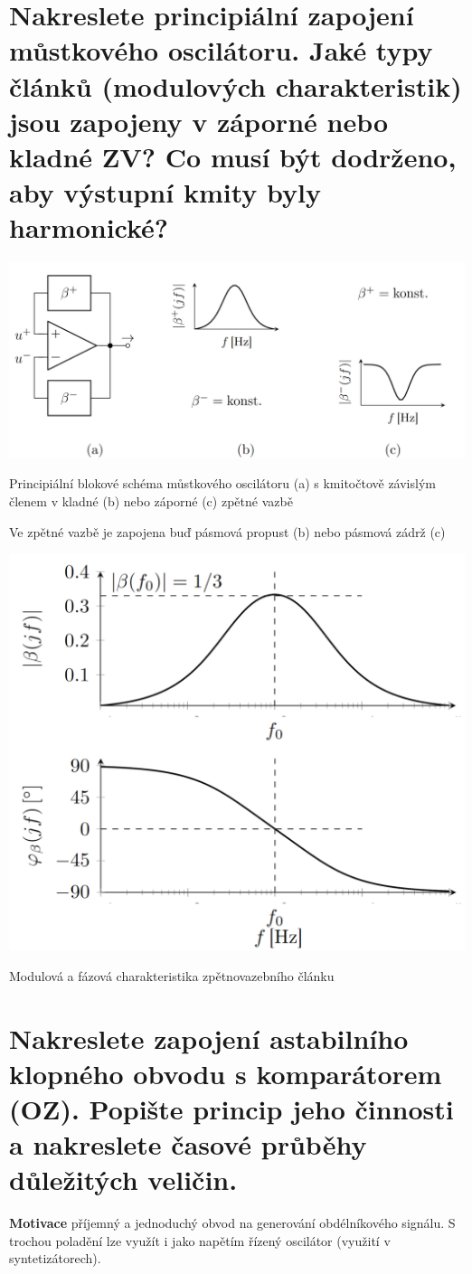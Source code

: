 \documentclass[a4paper,12pt]{article}   %
\begin{document}
\newpage
\section{Nakreslete principiální zapojení můstkového oscilátoru. Jaké typy článků (modulových charakteristik) jsou zapojeny v záporné nebo kladné ZV? Co musí být dodrženo, aby výstupní kmity byly harmonické?}
\begin{schema}[h!]
    \centering
    \includegraphics[width=.9\textwidth]{mustkovy-oscilator.PNG}
    \caption{Principiální blokové schéma můstkového oscilátoru (a) s kmitočtově závislým členem v kladné (b) nebo záporné (c) zpětné vazbě}
    \label{sch:mustkovy:oscilator}
\end{schema}

Ve zpětné vazbě je zapojena buď pásmová propust (b) nebo pásmová zádrž (c)

\begin{graf}[h!]
    \centering
    \includegraphics[width = .5\textwidth]{modulova-charakteristika-zv-clanku-oscilator.PNG}
    \caption{Modulová a fázová charakteristika zpětnovazebního článku}
    \label{graf:osc:modul:charstka}
\end{graf}







\section{Nakreslete zapojení astabilního klopného obvodu s komparátorem (OZ). Popište princip jeho činnosti a nakreslete časové průběhy důležitých veličin.}
\textbf{Motivace} příjemný a jednoduchý obvod na generování obdélníkového signálu. S trochou poladění lze využít i jako napětím řízený oscilátor (využití v syntetizátorech).
\end{document}
